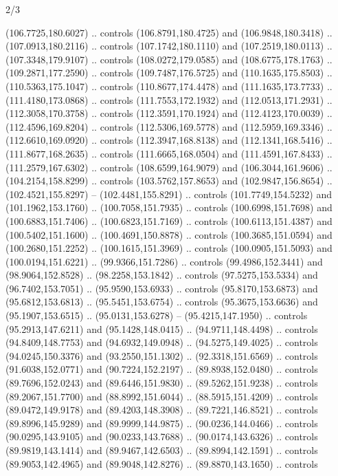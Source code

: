 \begin{flagdescription}{2/3}
\begin{scope}[shift={(0.5\flaglength,0.5)},scale=\flagwidth/320]
\begin{scope}[y=0.8pt, x=0.8pt, yscale=-1,shift={(-118.3,-146)}]
  (106.7725,180.6027) .. controls (106.8791,180.4725) and (106.9848,180.3418) ..
  (107.0913,180.2116) .. controls (107.1742,180.1110) and (107.2519,180.0113) ..
  (107.3348,179.9107) .. controls (108.0272,179.0585) and (108.6775,178.1763) ..
  (109.2871,177.2590) .. controls (109.7487,176.5725) and (110.1635,175.8503) ..
  (110.5363,175.1047) .. controls (110.8677,174.4478) and (111.1635,173.7733) ..
  (111.4180,173.0868) .. controls (111.7553,172.1932) and (112.0513,171.2931) ..
  (112.3058,170.3758) .. controls (112.3591,170.1924) and (112.4123,170.0039) ..
  (112.4596,169.8204) .. controls (112.5306,169.5778) and (112.5959,169.3346) ..
  (112.6610,169.0920) .. controls (112.3947,168.8138) and (112.1341,168.5416) ..
  (111.8677,168.2635) .. controls (111.6665,168.0504) and (111.4591,167.8433) ..
  (111.2579,167.6302) .. controls (108.6599,164.9079) and (106.3044,161.9606) ..
  (104.2154,158.8299) .. controls (103.5762,157.8653) and (102.9847,156.8654) ..
  (102.4521,155.8297) -- (102.4481,155.8291) .. controls (101.7749,154.5232) and
  (101.1962,153.1760) .. (100.7058,151.7935) .. controls (100.6998,151.7698) and
  (100.6883,151.7406) .. (100.6823,151.7169) .. controls (100.6113,151.4387) and
  (100.5402,151.1600) .. (100.4691,150.8878) .. controls (100.3685,151.0594) and
  (100.2680,151.2252) .. (100.1615,151.3969) .. controls (100.0905,151.5093) and
  (100.0194,151.6221) .. (99.9366,151.7286) .. controls (99.4986,152.3441) and
  (98.9064,152.8528) .. (98.2258,153.1842) .. controls (97.5275,153.5334) and
  (96.7402,153.7051) .. (95.9590,153.6933) .. controls (95.8170,153.6873) and
  (95.6812,153.6813) .. (95.5451,153.6754) .. controls (95.3675,153.6636) and
  (95.1907,153.6515) .. (95.0131,153.6278) -- (95.4215,147.1950) .. controls
  (95.2913,147.6211) and (95.1428,148.0415) .. (94.9711,148.4498) .. controls
  (94.8409,148.7753) and (94.6932,149.0948) .. (94.5275,149.4025) .. controls
  (94.0245,150.3376) and (93.2550,151.1302) .. (92.3318,151.6569) .. controls
  (91.6038,152.0771) and (90.7224,152.2197) .. (89.8938,152.0480) .. controls
  (89.7696,152.0243) and (89.6446,151.9830) .. (89.5262,151.9238) .. controls
  (89.2067,151.7700) and (88.8992,151.6044) .. (88.5915,151.4209) .. controls
  (89.0472,149.9178) and (89.4203,148.3908) .. (89.7221,146.8521) .. controls
  (89.8996,145.9289) and (89.9999,144.9875) .. (90.0236,144.0466) .. controls
  (90.0295,143.9105) and (90.0233,143.7688) .. (90.0174,143.6326) .. controls
  (89.9819,143.1414) and (89.9467,142.6503) .. (89.8994,142.1591) .. controls
  (89.9053,142.4965) and (89.9048,142.8276) .. (89.8870,143.1650) .. controls

\end{scope}
\end{scope}
\end{flagdescription}
